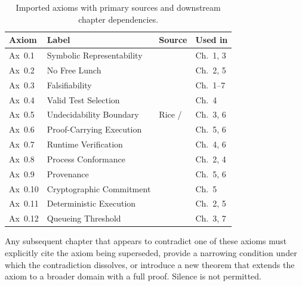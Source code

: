 \begin{table}[ht]
\centering
\small
\begin{tabular}{llll}
\toprule
\textbf{Axiom} & \textbf{Label} & \textbf{Source} & \textbf{Used in} \\
\midrule
Ax~0.1 & Symbolic Representability & \cite{robinson1965}                          & Ch.\ 1, 3 \\
Ax~0.2 & No Free Lunch             & \cite{wolpert1997nfl}                         & Ch.\ 2, 5 \\
Ax~0.3 & Falsifiability            & \cite{popper1959,popper1963}                  & Ch.\ 1–7  \\
Ax~0.4 & Valid Test Selection      & \cite{goodenoughandgerhart1975}               & Ch.\ 4    \\
Ax~0.5 & Undecidability Boundary   & Rice / \cite{robinson1965}                    & Ch.\ 3, 6 \\
Ax~0.6 & Proof-Carrying Execution  & \cite{necula1997pcc}                          & Ch.\ 5, 6 \\
Ax~0.7 & Runtime Verification      & \cite{leucker2009rv}                          & Ch.\ 4, 6 \\
Ax~0.8 & Process Conformance       & \cite{vanderaalst2016,adriansyah2014aligning} & Ch.\ 2, 4 \\
Ax~0.9 & Provenance                & \cite{moreau2013prov}                         & Ch.\ 5, 6 \\
Ax~0.10 & Cryptographic Commitment & \cite{blake3_2020}                            & Ch.\ 5    \\
Ax~0.11 & Deterministic Execution  & \cite{webassembly2019}                        & Ch.\ 2, 5 \\
Ax~0.12 & Queueing Threshold       & \cite{feller1968}                             & Ch.\ 3, 7 \\
\bottomrule
\end{tabular}
\caption{Imported axioms with primary sources and downstream chapter dependencies.}
\label{tab:axioms}
\end{table}

\noindent
Any subsequent chapter that appears to contradict one of these axioms must
explicitly cite the axiom being superseded, provide a narrowing condition
under which the contradiction dissolves, or introduce a new theorem that
extends the axiom to a broader domain with a full proof.
Silence is not permitted.
